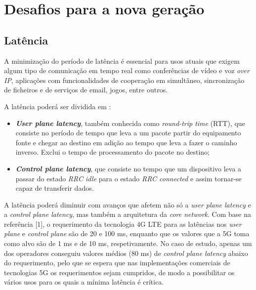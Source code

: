 \documentclass{llncs}
\begin{document}
\section{Desafios para a nova geração}

\subsection{Latência}
A minimização do período de latência é essencial para usos atuais que exigem algum tipo de comunicação em tempo real como conferências de vídeo e voz \textit{over IP}, aplicações com funcionalidades de cooperação em simultâneo, sincronização de ficheiros e de serviços de email, jogos, entre outros.

A latência poderá ser dividida em :
\begin{itemize}
	\item \textit{\textbf{User plane latency}}, também conhecida como \textit{round-trip time} (RTT), que consiste no período de tempo que leva a um pacote partir do equipamento fonte e chegar ao destino em adição ao tempo que leva a fazer o caminho inverso. Exclui o tempo de processamento do pacote no destino;
	\item \textit{\textbf{Control plane latency}}, que consiste no tempo que um dispositivo leva a passar do estado \textit{RRC idle} para o estado \textit{RRC connected} e assim tornar-se capaz de transferir dados.
\end{itemize}

A latência poderá diminuir com avanços que afetem não só a \textit{user plane latency} e a \textit{control plane latency}, mas também a arquitetura da \textit{core network}. Com base na referência [1], o requerimento da tecnologia 4G LTE para as latências nos \textit{user plane} e \textit{control plane} são de 20 e 100 ms, enquanto que os valores que a 5G toma como alvo são de 1 ms e de 10 ms, respetivamente. No caso de estudo, apenas um dos operadores conseguiu valores médios (80 ms) de \textit{control plane latency} abaixo do requerimento, pelo que se espera que nas implementações comerciais de tecnologias 5G os requerimentos sejam cumpridos, de modo a possibilitar os vários usos para os quais a mínima latência é crítica.
\end{document}
